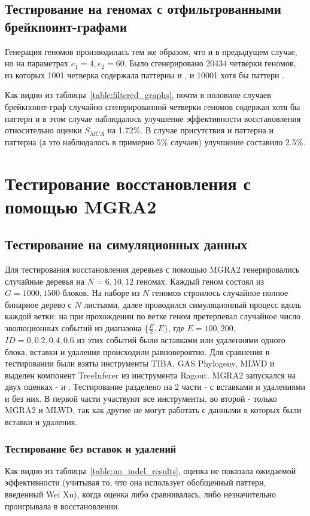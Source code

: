 \subsection{Тестирование на геномах с отфильтрованными брейкпоинт-графами}
Генерация геномов производилась тем же образом, что и в предыдущем случае, но на параметрах $e_1 = 4, e_2 = 60$.
Было сгенерировано 20434 четверки геномов, из которых 1001 четверка содержала паттерны  и ,
и 10001 хотя бы паттерн .

Как видно из таблицы~\ref{table:filtered_graphs}, почти в половине случаев брейкпоинт-граф случайно сгенерированной четверки геномов содержал
хотя бы паттерн  и в этом случае наблюдалось улучшение эффективности восстановления относительно оценки $S_{MCA}$ на 1.72\%.
В случае присутствия и паттерна  и паттерна  (а это наблюдалось в примерно 5\% случаев) улучшение составило 2.5\%.

\section{Тестирование восстановления с помощью MGRA2}
\subsection{Тестирование на симуляционных данных}
Для тестирования восстановления деревьев с помощью MGRA2 генерировались случайные деревья на $N = 6, 10, 12$ геномах.
Каждый геном состоял из $G = 1000, 1500$ блоков.
На наборе из $N$ геномов строилось случайное полное бинарное дерево с $N$ листьями, далее проводился симуляционный процесс вдоль каждой ветки:
на при прохождении по ветке геном претерпевал случайное число эволюционных событий из диапазона $\lbrace \frac{E}{2}, E \rbrace$,
где $E = 100, 200$, $ID = 0, 0.2, 0.4, 0.6$ из этих событий были вставками или удалениями одного блока, вставки и удаления происходили равновероятно.
Для сравнения в тестировании были взяты инструменты TIBA, GAS Phylogeny, MLWD и выделен компонент TreeInferer из инструмента Ragout.
MGRA2 запускался на двух оценках -  и .
Тестирование разделено на 2 части - с вставками и удалениями и без них.
В первой части участвуют все инструменты, во второй - только MGRA2 и MLWD,
так как другие не могут работать с данными в которых были вставки и удаления.

\subsubsection{Тестирование без вставок и удалений}

Как видно из таблицы~\ref{table:no_indel_results}, оценка  не показала ожидаемой эффективности
(учитывая то, что она использует обобщенный паттерн, введенный Wei Xu),
когда оценка  либо сравнивалась, либо незначительно проигрывала в восстановлении.


